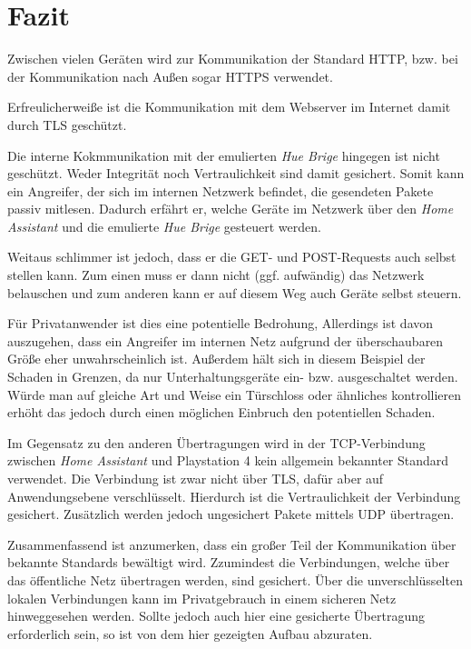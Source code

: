 \newpage

\section{Fazit}\label{sec:fazit}

Zwischen vielen Geräten wird zur Kommunikation der Standard HTTP,
bzw. bei der Kommunikation nach Außen sogar HTTPS verwendet.

Erfreulicherweiße ist die Kommunikation mit dem Webserver im Internet damit durch TLS geschützt.

Die interne Kokmmunikation mit der emulierten \textit{Hue Brige} hingegen ist nicht geschützt.
Weder Integrität noch Vertraulichkeit sind damit gesichert.
Somit kann ein Angreifer, der sich im internen Netzwerk befindet,
die gesendeten Pakete passiv mitlesen.
Dadurch erfährt er,
welche Geräte im Netzwerk über den \textit{Home Assistant} und die emulierte \textit{Hue Brige} gesteuert werden.

Weitaus schlimmer ist jedoch, dass er die GET- und POST-Requests auch selbst stellen kann.
Zum einen muss er dann nicht (ggf. aufwändig) das Netzwerk belauschen
und zum anderen kann er auf diesem Weg auch Geräte selbst steuern.

Für Privatanwender ist dies eine potentielle Bedrohung,
Allerdings ist davon auszugehen,
dass ein Angreifer im internen Netz aufgrund der überschaubaren Größe eher unwahrscheinlich ist.
Außerdem hält sich in diesem Beispiel der Schaden in Grenzen, da nur Unterhaltungsgeräte ein- bzw. ausgeschaltet werden.
Würde man auf gleiche Art und Weise ein Türschloss oder ähnliches kontrollieren erhöht das jedoch durch einen
möglichen Einbruch den potentiellen Schaden.

Im Gegensatz zu den anderen Übertragungen wird
in der TCP-Verbindung zwischen \textit{Home Assistant} und Playstation 4 kein allgemein bekannter Standard verwendet.
Die Verbindung ist zwar nicht über TLS, dafür aber auf Anwendungsebene verschlüsselt.
Hierdurch ist die Vertraulichkeit der Verbindung gesichert.
Zusätzlich werden jedoch ungesichert Pakete mittels UDP übertragen.

Zusammenfassend ist anzumerken,
dass ein großer Teil der Kommunikation über bekannte Standards bewältigt wird.
Zzumindest die Verbindungen, welche über das öffentliche Netz übertragen werden, sind gesichert.
Über die unverschlüsselten lokalen Verbindungen kann im Privatgebrauch in einem sicheren Netz hinweggesehen werden.
Sollte jedoch auch hier eine gesicherte Übertragung erforderlich sein,
so ist von dem hier gezeigten Aufbau abzuraten.
